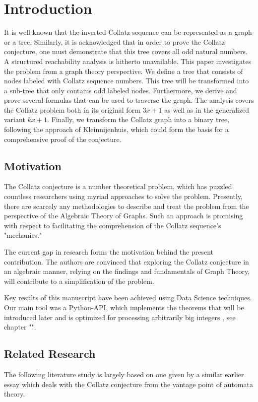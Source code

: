 \chapter{Introduction}

\begin{summary}
It is well known that the inverted Collatz sequence can be represented as a graph or a tree. Similarly, it is acknowledged that in order to prove the Collatz conjecture, one must demonstrate that this tree covers all odd natural numbers. A structured reachability analysis is hitherto unavailable. This paper investigates the problem from a graph theory perspective. We define a tree that consists of nodes labeled with Collatz sequence numbers. This tree will be transformed into a sub-tree that only contains odd labeled nodes. Furthermore, we derive and prove several formulas that can be used to traverse the graph. The analysis covers the Collatz problem both in its original form $3x+1$ as well as in the generalized variant $kx+1$. Finally, we transform the Collatz graph into a binary tree, following the approach of Kleinnijenhuis, which could form the basis for a comprehensive proof of the conjecture.
\end{summary}

\section{Motivation}
The Collatz conjecture is a number theoretical problem, which has puzzled countless researchers using myriad approaches to solve the problem. Presently, there are scarcely any methodologies to describe and treat the problem from the perspective of the Algebraic Theory of Graphs. Such an approach is promising with respect to facilitating the comprehension of the Collatz sequence’s "mechanics."

The current gap in research forms the motivation behind the present contribution. The authors are convinced that exploring the Collatz conjecture in an algebraic manner, relying on the ﬁndings and fundamentals of Graph Theory, will contribute to a simplification of the problem.

Key results of this manuscript have been achieved using Data Science techniques. Our main tool was a Python-API, which implements the theorems that will be introduced later and is optimized for processing arbitrarily big integers \cite{Ref_Koch_Github}, see chapter {\color{wisogreen}""}.

\section{Related Research}
The following literature study is largely based on one given by a similar earlier essay \cite{Ref_Sultanow_Volkov_Cox_2017} which deals with the Collatz conjecture from the vantage point of automata theory.

